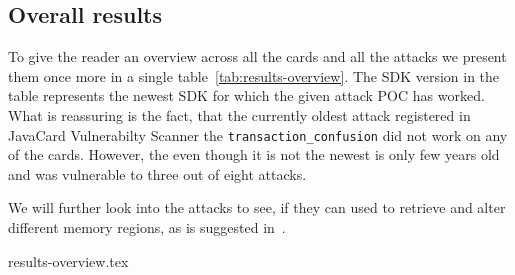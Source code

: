         \subsection{Overall results}
        To give the reader an overview across all the cards and all the attacks we present them once more in a single table~\ref{tab:results-overview}. The SDK version in the table represents the newest SDK for which the given attack POC has worked. What is reassuring is the fact, that the currently oldest attack registered in JavaCard Vulnerabilty Scanner the \texttt{transaction_confusion} did not work on any of the cards. However, the \Jcard even though it is not the newest is only few years old and was vulnerable to three out of eight attacks.
    
        We will further look into the attacks to see, if they can used to retrieve and alter different memory regions, as is suggested in~\cite{se:oracle:part1}.

\setlength{\tabcolsep}{2pt}
\renewcommand{\arraystretch}{1.2}

            {results-overview.tex}

\setlength{\tabcolsep}{\oldtabcolsep}
\renewcommand{\arraystretch}{1.2}
\setlength{\floatsep}{\oldtabcolsep}
